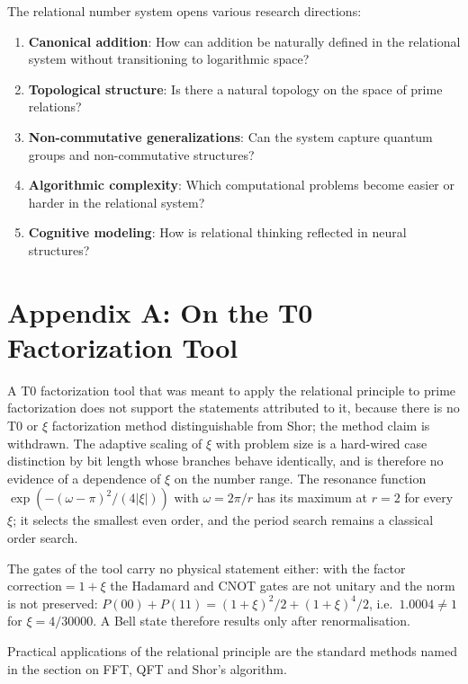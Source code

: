 	The relational number system opens various research directions:
	
	\begin{enumerate}
		\item \textbf{Canonical addition}: How can addition be naturally defined in the relational system without transitioning to logarithmic space?
		\item \textbf{Topological structure}: Is there a natural topology on the space of prime relations?
		\item \textbf{Non-commutative generalizations}: Can the system capture quantum groups and non-commutative structures?
		\item \textbf{Algorithmic complexity}: Which computational problems become easier or harder in the relational system?
		\item \textbf{Cognitive modeling}: How is relational thinking reflected in neural structures?
	\end{enumerate}
	
	\section{Appendix A: On the T0 Factorization Tool}
	
	A T0 factorization tool that was meant to apply the relational principle to prime factorization does not support the statements attributed to it, because there is no T0 or $\xi$ factorization method distinguishable from Shor; the method claim is withdrawn. The adaptive scaling of $\xi$ with problem size is a hard-wired case distinction by bit length whose branches behave identically, and is therefore no evidence of a dependence of $\xi$ on the number range. The resonance function $\exp\left(-(\omega-\pi)^2/(4|\xi|)\right)$ with $\omega = 2\pi/r$ has its maximum at $r = 2$ for every $\xi$; it selects the smallest even order, and the period search remains a classical order search.
	
	The gates of the tool carry no physical statement either: with the factor $\text{correction} = 1+\xi$ the Hadamard and CNOT gates are not unitary and the norm is not preserved: $P(00)+P(11) = (1+\xi)^2/2 + (1+\xi)^4/2$, i.e.\ $1.0004 \neq 1$ for $\xi = 4/30000$. A Bell state therefore results only after renormalisation.
	
	Practical applications of the relational principle are the standard methods named in the section on FFT, QFT and Shor's algorithm.
